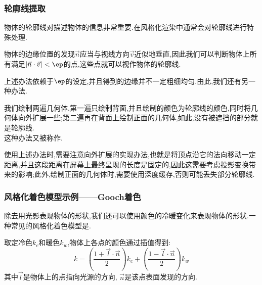 \documentclass{ctexart}
\begin{document}
\subsubsection{轮廓线提取}
物体的轮廓线对描述物体的信息非常重要.在风格化渲染中通常会对轮廓线进行特殊处理.
\begin{theorem}[轮廓线的提取方法I]
    物体的边缘位置的发现$\vec{n}$应当与视线方向$\vec{v}$近似地垂直,因此我们可以判断物体上所有满足$\left|\vec{n}\cdot\vec{v}\right|<\ep$的点,这些点就可以视作物体的轮廓线.
\end{theorem}
上述办法依赖于$\ep$的设定,并且得到的边缘并不一定粗细均匀.由此,我们还有另一种办法.
\begin{theorem}[轮廓线的提取办法II]
    我们绘制两遍几何体.第一遍只绘制背面,并且绘制的颜色为轮廓线的颜色,同时将几何体向外扩展一些;第二遍再在背面上绘制正面的几何体,如此,没有被遮挡的部分就是轮廓线.\\
    这种办法又被称作.
\end{theorem}
使用上述办法时,需要注意向外扩展的实现办法,也就是将顶点沿它的法向移动一定距离,并且这段距离在屏幕上最终呈现的长度是固定的,因此这需要考虑投影变换带来的影响;此外,绘制正面的几何体时,需要使用深度缓存,否则可能丢失部分轮廓线.
\subsubsection{风格化着色模型示例——Gooch着色}
除去用光影表现物体的形状,我们还可以使用颜色的冷暖变化来表现物体的形状.一种常见的风格化着色模型是.
\begin{definition}[Gooch着色]
    取定冷色$k_{c}$和暖色$k_w$,物体上各点的颜色通过插值得到:
    \[k=\left(\dfrac{1+\vec{l}\cdot\vec{n}}{2}\right)k_c+\left(\dfrac{1-\vec{l}\cdot\vec{n}}{2}\right)k_w\]
    其中$\vec{l}$是物体上的点指向光源的方向, $\vec{n}$是该点表面发现的方向.
\end{definition}
\end{document}
